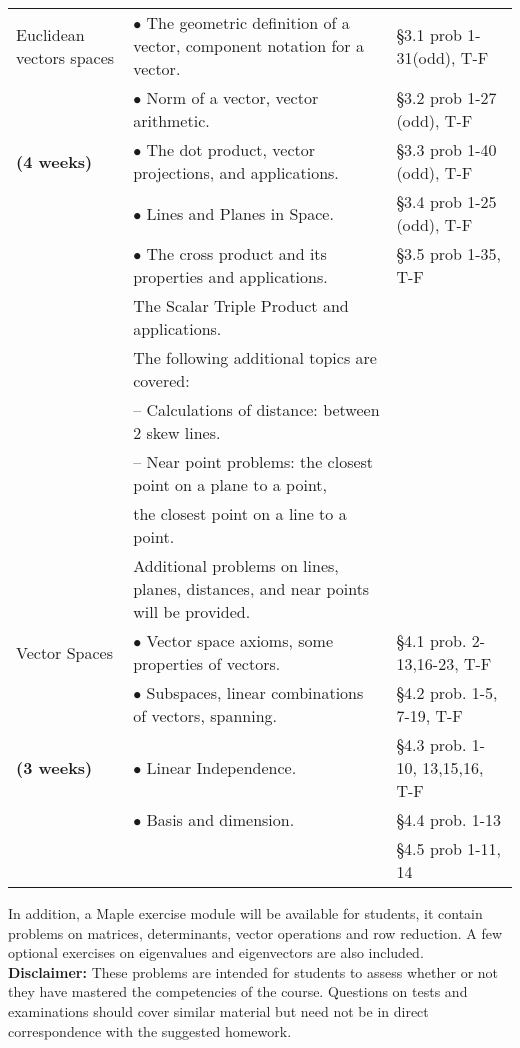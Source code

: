 {\begin{landscape}
\begin{longtable}[t]{||p{1.75in}|p{4.5in}|p{3.75in}||}
Euclidean vectors spaces
	& $\bullet$ The geometric definition of a vector, component notation for a vector.
	& \S 3.1 prob 1-31(odd), T-F
\\
	& $\bullet$ Norm of a vector, vector arithmetic.
	& \S 3.2 prob 1-27 (odd), T-F
\\ \textbf{(4 weeks)}
	& $\bullet$ The dot product, vector projections, and applications.
	& \S 3.3 prob 1-40 (odd), T-F
\\
	& $\bullet$ Lines and Planes in Space.
	& \S 3.4 prob 1-25 (odd), T-F
\\
	& $\bullet$ The cross product and its properties and applications.
	& \S 3.5 prob 1-35, T-F
\\
	& The Scalar Triple Product and applications.
	&
\\
	& The following additional topics are covered:
	&
\\
	& \hspace{0.1in} -- Calculations of distance: between 2 skew lines.
	&
\\
	& \hspace{0.1in} -- Near point problems: the closest point on a plane to a point,
	&
\\
	& \hspace{0.1in} \phantom{--} the closest point on a line to a point.
	&
\\
	& Additional problems on lines, planes, distances, and near points will be provided.
	&
\\ \hline

Vector Spaces
	& $\bullet$ Vector space axioms, some properties of vectors.
	& \S 4.1 prob. 2-13,16-23, T-F
\\
	& $\bullet$ Subspaces, linear combinations of vectors, spanning.
	& \S 4.2 prob. 1-5, 7-19, T-F
\\ \textbf{(3 weeks)}
	& $\bullet$ Linear Independence.
	& \S 4.3 prob. 1-10, 13,15,16, T-F
\\
	& $\bullet$ Basis and dimension.
	& \S 4.4 prob. 1-13
\\
	&
	& \S 4.5 prob 1-11, 14
\\

\hline
\end{longtable}
In addition, a Maple exercise module will be available for students, it contain problems on matrices, determinants, vector operations and row reduction. A few optional exercises on eigenvalues and eigenvectors are also included.\\

\noindent \textbf{Disclaimer:}  These problems are intended for students to assess whether or not they have mastered the competencies of the course.  Questions on tests and examinations should cover similar material but need not be in direct correspondence with the suggested homework.
\end{landscape}
}
